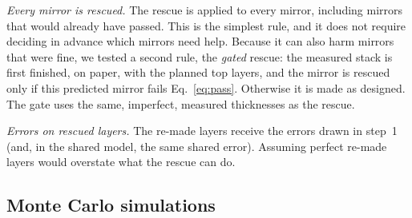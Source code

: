 \emph{Every mirror is rescued.} The rescue is applied to every mirror, including mirrors that would already have passed. This is the simplest rule, and it does not require deciding in advance which mirrors need help. Because it can also harm mirrors that were fine, we tested a second rule, the \emph{gated} rescue: the measured stack is first finished, on paper, with the planned top layers, and the mirror is rescued only if this predicted mirror fails Eq.~\eqref{eq:pass}. Otherwise it is made as designed. The gate uses the same, imperfect, measured thicknesses as the rescue.

\emph{Errors on rescued layers.} The re-made layers receive the errors drawn in step~1 (and, in the shared model, the same shared error). Assuming perfect re-made layers would overstate what the rescue can do.

\subsection{Monte Carlo simulations}

